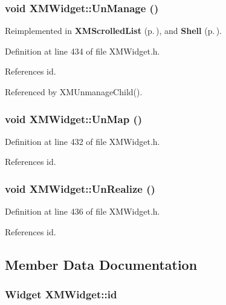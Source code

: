 \subsubsection{\setlength{\rightskip}{0pt plus 5cm}void XMWidget::Un\-Manage ()\hspace{0.3cm}{\tt  [inline]}}\label{classXMWidget_a17}




Reimplemented in {\bf XMScrolled\-List} {\rm (p.\,\pageref{classXMScrolledList_a4})}, and {\bf Shell} {\rm (p.\,\pageref{classShell_a10})}.

Definition at line 434 of file XMWidget.h.

References id.

Referenced by XMUnmanage\-Child().
\subsubsection{\setlength{\rightskip}{0pt plus 5cm}void XMWidget::Un\-Map ()\hspace{0.3cm}{\tt  [inline]}}\label{classXMWidget_a15}




Definition at line 432 of file XMWidget.h.

References id.
\subsubsection{\setlength{\rightskip}{0pt plus 5cm}void XMWidget::Un\-Realize ()\hspace{0.3cm}{\tt  [inline]}}\label{classXMWidget_a19}




Definition at line 436 of file XMWidget.h.

References id.

\subsection{Member Data Documentation}
\subsubsection{\setlength{\rightskip}{0pt plus 5cm}Widget XMWidget::id\hspace{0.3cm}{\tt  [protected]}}\label{classXMWidget_n0}




